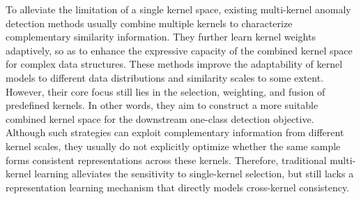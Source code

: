 \documentclass[times, review, 10pt]{elsarticle}
\begin{document}

To alleviate the limitation of a single kernel space, existing multi-kernel anomaly detection methods usually combine multiple kernels to 
characterize complementary similarity information. They further learn kernel weights adaptively, so as to enhance the expressive 
capacity of the combined kernel space for complex data structures. These methods improve the adaptability of kernel models to different 
data distributions and similarity scales to some extent. However, their core focus still lies in the selection, weighting, and fusion of 
predefined kernels. In other words, they aim to construct a more suitable combined kernel space for the downstream one-class detection 
objective. Although such strategies can exploit complementary information from different kernel scales, they usually do not explicitly 
optimize whether the same sample forms consistent representations across these kernels. Therefore, traditional multi-kernel learning alleviates 
the sensitivity to single-kernel selection, but still lacks a representation learning mechanism that directly models cross-kernel consistency.
\end{document}
